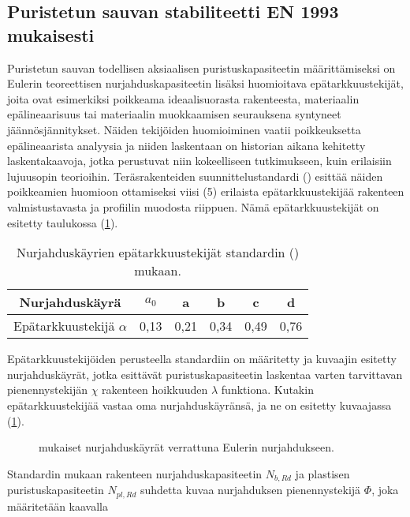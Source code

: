 \documentclass[12pt]{article}
\newenvironment{content}{\pagenumbering{arabic}}{}
\begin{document}
\begin{content}
\subsection{Puristetun sauvan stabiliteetti EN 1993 mukaisesti}

Puristetun sauvan todellisen aksiaalisen puristuskapasiteetin määrittämiseksi on Eulerin teoreettisen nurjahduskapasiteetin lisäksi huomioitava epätarkkuustekijät, joita ovat esimerkiksi poikkeama ideaalisuorasta rakenteesta, materiaalin epälineaarisuus tai materiaalin muokkaamisen seurauksena syntyneet jäännösjännitykset. Näiden tekijöiden huomioiminen vaatii poikkeuksetta epälineaarista analyysia ja niiden laskentaan on historian aikana kehitetty laskentakaavoja, jotka perustuvat niin kokeelliseen tutkimukseen, kuin erilaisiin lujuusopin teorioihin.\parencite[27]{ziemian} Teräsrakenteiden suunnittelustandardi (\citeauthor{en1993}) esittää näiden poikkeamien huomioon ottamiseksi viisi (5) erilaista epätarkkuustekijää rakenteen valmistustavasta ja profiilin muodosta riippuen. Nämä epätarkkuustekijät on esitetty taulukossa (\ref{epätarkkuustekijät}). 

\begin{table}[htb]
\centering
\caption{Nurjahduskäyrien epätarkkuustekijät standardin (\citeauthor{en1993})  mukaan.}
\begin{tabular}{c c c c c c}
\label{epätarkkuustekijät}

Nurjahduskäyrä & $a_0$ & a & b & c & d \\
\hline
Epätarkkuustekijä $\alpha$ & 0,13 & 0,21 & 0,34 & 0,49 & 0,76
\end{tabular}
\end{table}

Epätarkkuustekijöiden perusteella standardiin on määritetty ja kuvaajin esitetty nurjahduskäyrät, jotka esittävät puristuskapasiteetin laskentaa varten tarvittavan pienennystekijän $\chi$ rakenteen hoikkuuden $\lambda$ funktiona. Kutakin epätarkkuustekijää vastaa oma nurjahduskäyränsä, ja ne on esitetty kuvaajassa (\ref{fig:nurjahduskäyräkuvaaja}). 

\begin{figure}[htb]

\caption{\citeauthor{en1993} mukaiset nurjahduskäyrät verrattuna Eulerin nurjahdukseen. }
\label{fig:nurjahduskäyräkuvaaja}
\end{figure}

Standardin mukaan rakenteen nurjahduskapasiteetin $N_{b,Rd}$ ja plastisen puristuskapasiteetin $N_{pl,Rd}$ suhdetta kuvaa nurjahduksen pienennystekijä $\Phi$, joka määritetään kaavalla


\end{content}
\end{document}
